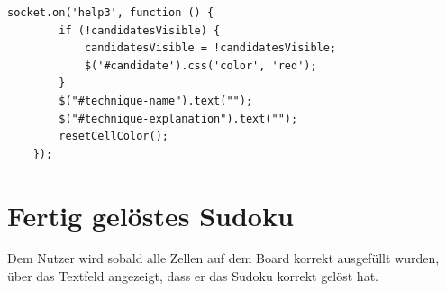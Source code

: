 \begin{lstlisting}[caption={Vierte Hilfestellung}, label={lst:help3}]
	socket.on('help3', function () {
		if (!candidatesVisible) {
			candidatesVisible = !candidatesVisible;
			$('#candidate').css('color', 'red');
		}
		$("#technique-name").text("");
		$("#technique-explanation").text("");
		resetCellColor();
	});

\end{lstlisting}

\section{Fertig gelöstes Sudoku}
Dem Nutzer wird sobald alle Zellen auf dem Board korrekt ausgefüllt wurden, über das Textfeld angezeigt, dass er das Sudoku korrekt gelöst hat.